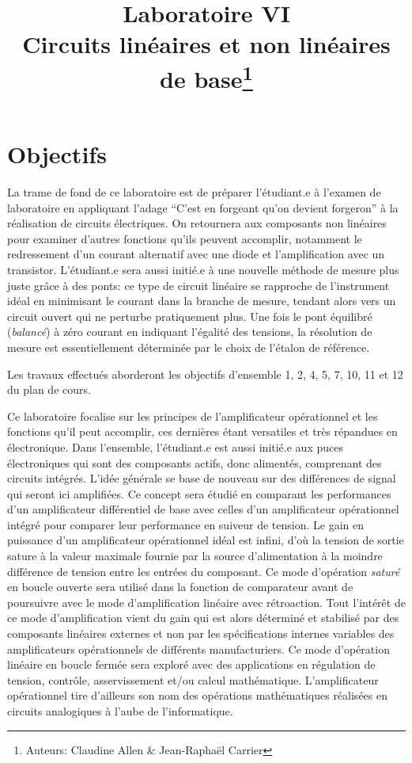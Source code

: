 \documentclass[canadien,12pt,oneside,letterpaper]{article}
\title{\textbf{Laboratoire VI}\\Circuits linéaires et non linéaires de base\thanks{Auteurs: Claudine Allen \& Jean-Raphaël Carrier}}
\date{}
\begin{document}
\maketitle \vspace{-2cm}

\section{Objectifs}

La trame de fond de ce laboratoire est de préparer l’étudiant.e à l’examen de laboratoire en appliquant l’adage “C’est en forgeant qu’on devient forgeron” à la réalisation de circuits électriques. On retournera aux composants non linéaires pour examiner d’autres fonctions qu’ils peuvent accomplir, notamment le redressement d’un courant alternatif avec une diode et l’amplification avec un transistor. L’étudiant.e sera aussi initié.e à une nouvelle méthode de mesure plus juste grâce à des ponts: ce type de circuit linéaire se rapproche de l’instrument idéal en minimisant le courant dans la branche de mesure, tendant alors vers un circuit ouvert qui ne perturbe pratiquement plus. Une fois le pont équilibré (\textit{balancé}) à zéro courant en indiquant l’égalité des tensions, la résolution de mesure est essentiellement déterminée par le choix de l’étalon de référence.

Les travaux effectués aborderont les objectifs d’ensemble 1, 2, 4, 5, 7, 10, 11 et 12 du plan de cours.

Ce laboratoire focalise sur les principes de l’amplificateur opérationnel et les fonctions qu’il peut accomplir, ces dernières étant versatiles et très répandues en électronique. Dans l’ensemble, l’étudiant.e est aussi initié.e aux puces électroniques qui sont des composants actifs, donc alimentés, comprenant des circuits intégrés. L’idée générale se base de nouveau sur des différences de signal qui seront ici amplifiées. Ce concept sera étudié en comparant les performances d’un amplificateur différentiel de base avec celles d’un amplificateur opérationnel intégré pour comparer leur performance en suiveur de tension. Le gain en puissance d’un amplificateur opérationnel idéal est infini, d’où la tension de sortie sature à la valeur maximale fournie par la source d’alimentation à la moindre différence de tension entre les entrées du composant. Ce mode d’opération \textit{saturé} en boucle ouverte sera utilisé dans la fonction de comparateur avant de poursuivre avec le mode d’amplification linéaire avec rétroaction. Tout l’intérêt de ce mode d’amplification vient du gain qui est alors déterminé et stabilisé par des composants linéaires externes et non par les spécifications internes variables des amplificateurs opérationnels de différents manufacturiers. Ce mode d’opération linéaire en boucle fermée sera exploré avec des applications en régulation de tension, contrôle, asservissement et/ou calcul mathématique. L’amplificateur opérationnel tire d’ailleurs son nom des opérations mathématiques réalisées en circuits analogiques à l’aube de l’informatique.
\end{document}
